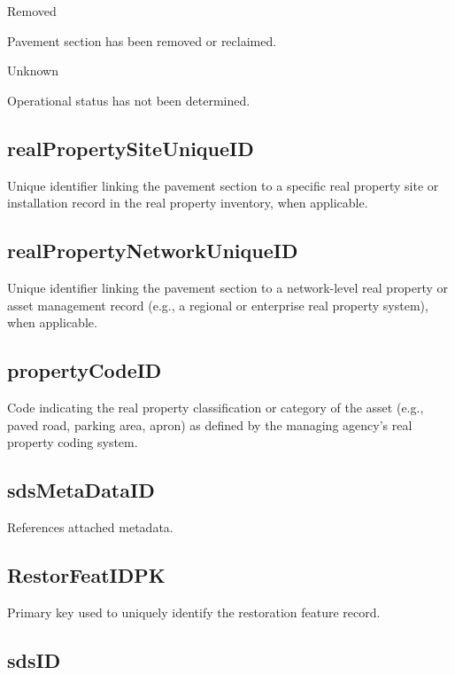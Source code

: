 \documentclass[
  letterpaper,
  DIV=11,
  numbers=noendperiod]{scrreprt}
\begin{document}
Removed

Pavement section has been removed or reclaimed.

Unknown

Operational status has not been determined.

\subsection{realPropertySiteUniqueID}\label{realpropertysiteuniqueid-2}

Unique identifier linking the pavement section to a specific real
property site or installation record in the real property inventory,
when applicable.

\subsection{realPropertyNetworkUniqueID}\label{realpropertynetworkuniqueid-2}

Unique identifier linking the pavement section to a network-level real
property or asset management record (e.g., a regional or enterprise real
property system), when applicable.

\subsection{propertyCodeID}\label{propertycodeid-2}

Code indicating the real property classification or category of the
asset (e.g., paved road, parking area, apron) as defined by the managing
agency's real property coding system.

\subsection{sdsMetaDataID}\label{sdsmetadataid-22}

References attached metadata.

\subsection{RestorFeatIDPK}\label{restorfeatidpk-22}

Primary key used to uniquely identify the restoration feature record.

\subsection{sdsID}\label{sdsid-22}
\end{document}
